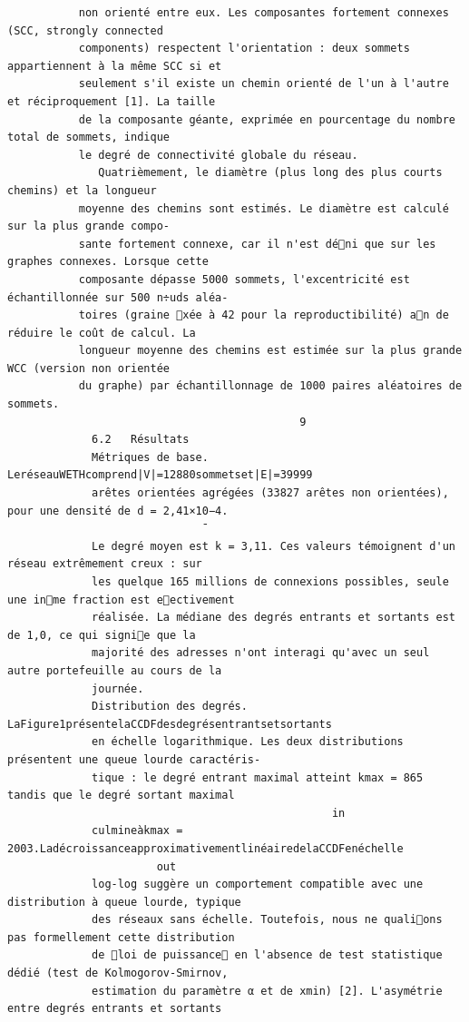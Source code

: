 \documentclass[12pt]{article}
\begin{document}
\begin{verbatim}
           non orienté entre eux. Les composantes fortement connexes (SCC, strongly connected
           components) respectent l'orientation : deux sommets appartiennent à la même SCC si et
           seulement s'il existe un chemin orienté de l'un à l'autre et réciproquement [1]. La taille
           de la composante géante, exprimée en pourcentage du nombre total de sommets, indique
           le degré de connectivité globale du réseau.
              Quatrièmement, le diamètre (plus long des plus courts chemins) et la longueur
           moyenne des chemins sont estimés. Le diamètre est calculé sur la plus grande compo-
           sante fortement connexe, car il n'est déni que sur les graphes connexes. Lorsque cette
           composante dépasse 5000 sommets, l'excentricité est échantillonnée sur 500 n÷uds aléa-
           toires (graine xée à 42 pour la reproductibilité) an de réduire le coût de calcul. La
           longueur moyenne des chemins est estimée sur la plus grande WCC (version non orientée
           du graphe) par échantillonnage de 1000 paires aléatoires de sommets.
                                             9
             6.2   Résultats
             Métriques de base. LeréseauWETHcomprend|V|=12880sommetset|E|=39999
             arêtes orientées agrégées (33827 arêtes non orientées), pour une densité de d = 2,41×10−4.
                              ¯
             Le degré moyen est k = 3,11. Ces valeurs témoignent d'un réseau extrêmement creux : sur
             les quelque 165 millions de connexions possibles, seule une inme fraction est eectivement
             réalisée. La médiane des degrés entrants et sortants est de 1,0, ce qui signie que la
             majorité des adresses n'ont interagi qu'avec un seul autre portefeuille au cours de la
             journée.
             Distribution des degrés.  LaFigure1présentelaCCDFdesdegrésentrantsetsortants
             en échelle logarithmique. Les deux distributions présentent une queue lourde caractéris-
             tique : le degré entrant maximal atteint kmax = 865 tandis que le degré sortant maximal
                                                  in
             culmineàkmax = 2003.LadécroissanceapproximativementlinéairedelaCCDFenéchelle
                       out
             log-log suggère un comportement compatible avec une distribution à queue lourde, typique
             des réseaux sans échelle. Toutefois, nous ne qualions pas formellement cette distribution
             de loi de puissance en l'absence de test statistique dédié (test de Kolmogorov-Smirnov,
             estimation du paramètre α et de xmin) [2]. L'asymétrie entre degrés entrants et sortants

\end{verbatim}
\end{document}
